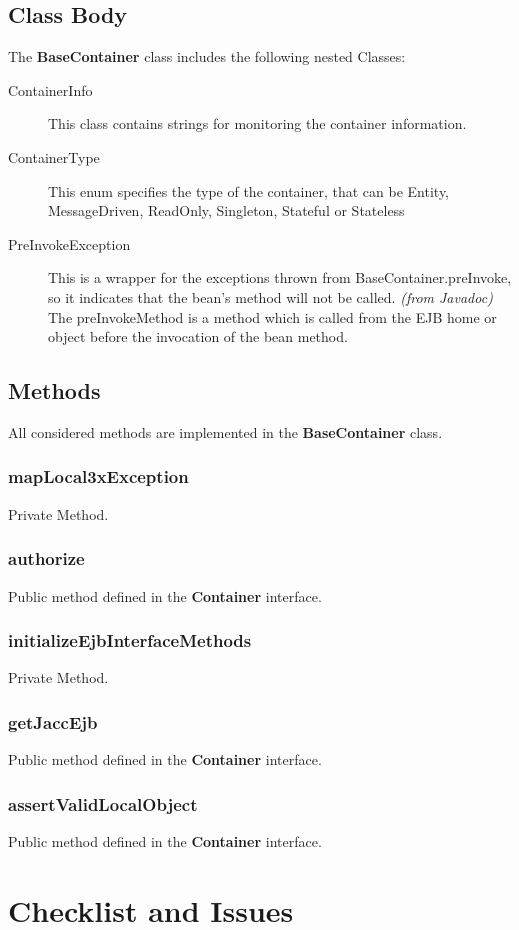 \documentclass[11pt, a4paper,titlepage]{article}
\begin{document}
	 \subsection{Class Body}
	 The \textbf{BaseContainer} class includes the following nested Classes:
			\begin{description}
				\item[ContainerInfo] This class contains strings for monitoring the container information.
				\item[ContainerType] This enum specifies the type of the container, that can be Entity, MessageDriven, ReadOnly, Singleton, Stateful or Stateless
				\item[PreInvokeException] This is a wrapper for the exceptions thrown from BaseContainer.preInvoke, so it indicates that the bean's method will not be called. \textit{(from Javadoc)}
				The preInvokeMethod is a method which is called from the EJB home or object before the invocation of the bean method.
			\end{description}
	 \subsection{Methods}
	 All considered methods are implemented in the \textbf{BaseContainer} class. 
	 \subsubsection{mapLocal3xException}
	 Private Method.
	 \subsubsection{authorize}
	 Public method defined in the \textbf{Container} interface.
	 \subsubsection{initializeEjbInterfaceMethods}
	 Private Method.
	 \subsubsection{getJaccEjb}
	 Public method defined in the \textbf{Container} interface.
	 \subsubsection{assertValidLocalObject}
	 Public method defined in the \textbf{Container} interface.
\section{Checklist and Issues}
\end{document}
